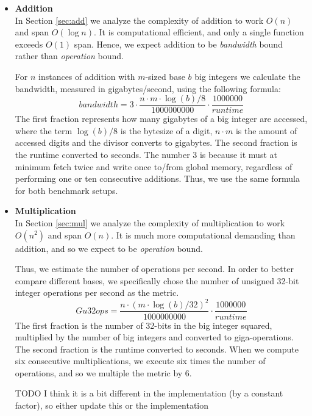 \begin{itemize}[leftmargin=*]
\item \textbf{Addition}\\
  In Section \ref{sec:add} we analyze the complexity of addition to work $O(n)$
  and span $O(\log n)$. It is computational efficient, and only a single
   function exceeds $O(1)$ span. Hence, we expect addition to be
  \textit{bandwidth} bound rather than \textit{operation} bound.

  For $n$ instances of addition with $m$-sized base $b$ big integers we
  calculate the bandwidth, measured in gigabytes/second, using the following
  formula:
  \begin{equation}
    \label{eq:bandwidth}
    \mathit{bandwidth} = 3 \cdot \dfrac{n \cdot m \cdot \log(b)/8}{1000000000} \cdot \dfrac{1000000}{\mathit{runtime}}
  \end{equation}
  The first fraction represents how many gigabytes of a big integer are
  accessed, where the term $\log(b) / 8$ is the bytesize of a digit, $n\cdot m$ is
  the amount of accessed digits and the divisor converts to gigabytes. The
  second fraction is the runtime converted to seconds. The number 3 is because
  it must at minimum fetch twice and write once to/from global memory,
  regardless of performing one or ten consecutive additions. Thus, we use the
  same formula for both benchmark setups.
  

\item \textbf{Multiplication}\\
  In Section \ref{sec:mul} we analyze the complexity of multiplication to work
  $O(n^2)$ and span $O(n)$. It is much more computational demanding than
  addition, and so we expect to be \textit{operation} bound.

  Thus, we estimate the number of operations per second. In order to better
  compare different bases, we specifically chose the number of unsigned 32-bit
  integer operations per second as the metric.
  \begin{equation}
  \label{eq:u32ops}
  \mathit{Gu32ops} = \dfrac{n \cdot (m \cdot \log(b) / 32)^2}{1000000000} \cdot \dfrac{1000000}{\mathit{runtime}}
  \end{equation}
  The first fraction is the number of 32-bits in the big integer squared,
  multiplied by the number of big integers and converted to giga-operations. The
  second fraction is the runtime converted to seconds. When we compute six
  consecutive multiplications, we execute six times the number of operations,
  and so we multiple the metric by 6.

  {\color{red} TODO I think it is a bit different in the implementation (by a
    constant factor), so either update this or the implementation}
\end{itemize}

